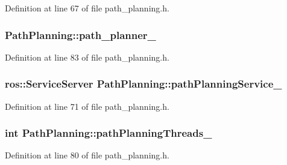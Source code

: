 Definition at line 67 of file path\-\_\-planning.\-h.

\hypertarget{classPathPlanning_a9baf3995e48bfcb73b15db9c9b0ee0f3}{
\subsubsection[{path\-\_\-planner\-\_\-}]{ Path\-Planning\-::path\-\_\-planner\-\_\-\hspace{0.3cm}{\ttfamily [private]}}}\label{classPathPlanning_a9baf3995e48bfcb73b15db9c9b0ee0f3}


Definition at line 83 of file path\-\_\-planning.\-h.

\hypertarget{classPathPlanning_a7508db0be8dbd74709c582a0e3a2af60}{
\subsubsection[{path\-Planning\-Service\-\_\-}]{\setlength{\rightskip}{0pt plus 5cm}ros\-::\-Service\-Server Path\-Planning\-::path\-Planning\-Service\-\_\-\hspace{0.3cm}{\ttfamily [private]}}}\label{classPathPlanning_a7508db0be8dbd74709c582a0e3a2af60}


Definition at line 71 of file path\-\_\-planning.\-h.

\hypertarget{classPathPlanning_a5efb84ce4c2a62274b4d86bbe36da4e5}{
\subsubsection[{path\-Planning\-Threads\-\_\-}]{\setlength{\rightskip}{0pt plus 5cm}int Path\-Planning\-::path\-Planning\-Threads\-\_\-\hspace{0.3cm}{\ttfamily [private]}}}\label{classPathPlanning_a5efb84ce4c2a62274b4d86bbe36da4e5}


Definition at line 80 of file path\-\_\-planning.\-h.

